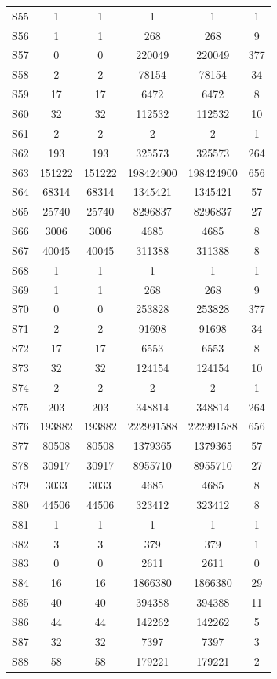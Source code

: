 {\begin{longtable}{l S[table-format=9.0] S[table-format=9.0] S[table-format=9.0] S[table-format=9.0] S[table-format=9.0]}
S55 & 1 & 1 & 1 & 1 & 1 \\
S56 & 1 & 1 & 268 & 268 & 9 \\
S57 & 0 & 0 & 220049 & 220049 & 377 \\
S58 & 2 & 2 & 78154 & 78154 & 34 \\
S59 & 17 & 17 & 6472 & 6472 & 8 \\
S60 & 32 & 32 & 112532 & 112532 & 10 \\
S61 & 2 & 2 & 2 & 2 & 1 \\
S62 & 193 & 193 & 325573 & 325573 & 264 \\
S63 & 151222 & 151222 & 198424900 & 198424900 & 656 \\
S64 & 68314 & 68314 & 1345421 & 1345421 & 57 \\
S65 & 25740 & 25740 & 8296837 & 8296837 & 27 \\
S66 & 3006 & 3006 & 4685 & 4685 & 8 \\
S67 & 40045 & 40045 & 311388 & 311388 & 8 \\
S68 & 1 & 1 & 1 & 1 & 1 \\
S69 & 1 & 1 & 268 & 268 & 9 \\
S70 & 0 & 0 & 253828 & 253828 & 377 \\
S71 & 2 & 2 & 91698 & 91698 & 34 \\
S72 & 17 & 17 & 6553 & 6553 & 8 \\
S73 & 32 & 32 & 124154 & 124154 & 10 \\
S74 & 2 & 2 & 2 & 2 & 1 \\
S75 & 203 & 203 & 348814 & 348814 & 264 \\
S76 & 193882 & 193882 & 222991588 & 222991588 & 656 \\
S77 & 80508 & 80508 & 1379365 & 1379365 & 57 \\
S78 & 30917 & 30917 & 8955710 & 8955710 & 27 \\
S79 & 3033 & 3033 & 4685 & 4685 & 8 \\
S80 & 44506 & 44506 & 323412 & 323412 & 8 \\
S81 & 1 & 1 & 1 & 1 & 1 \\
S82 & 3 & 3 & 379 & 379 & 1 \\
S83 & 0 & 0 & 2611 & 2611 & 0 \\
S84 & 16 & 16 & 1866380 & 1866380 & 29 \\
S85 & 40 & 40 & 394388 & 394388 & 11 \\
S86 & 44 & 44 & 142262 & 142262 & 5 \\
S87 & 32 & 32 & 7397 & 7397 & 3 \\
S88 & 58 & 58 & 179221 & 179221 & 2 \\

\end{longtable}}
